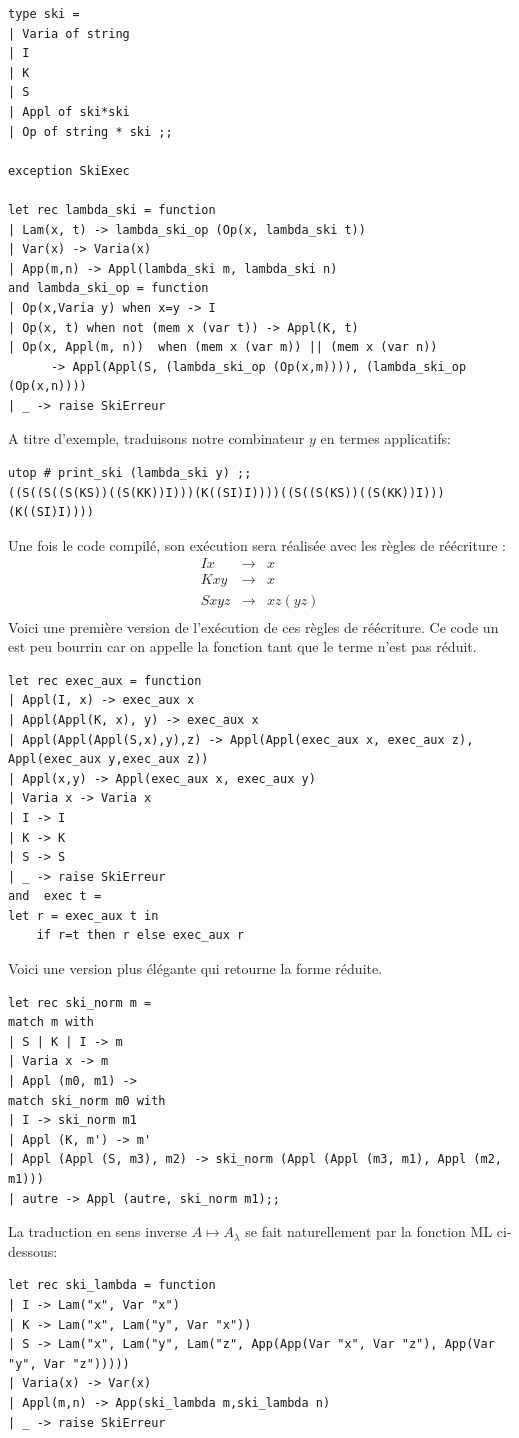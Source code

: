\documentclass[11pt]{book}
\begin{document}
\begin{Verbatim}
type ski = 
| Varia of string
| I
| K
| S
| Appl of ski*ski 
| Op of string * ski ;;

exception SkiExec

let rec lambda_ski = function
| Lam(x, t) -> lambda_ski_op (Op(x, lambda_ski t))
| Var(x) -> Varia(x)
| App(m,n) -> Appl(lambda_ski m, lambda_ski n) 
and lambda_ski_op = function
| Op(x,Varia y) when x=y -> I 
| Op(x, t) when not (mem x (var t)) -> Appl(K, t) 
| Op(x, Appl(m, n))  when (mem x (var m)) || (mem x (var n)) 
	  -> Appl(Appl(S, (lambda_ski_op (Op(x,m)))), (lambda_ski_op (Op(x,n)))) 
| _ -> raise SkiErreur
\end{Verbatim}
A titre d'exemple, traduisons notre combinateur $y$ en termes applicatifs:
\begin{Verbatim}
utop # print_ski (lambda_ski y) ;;
((S((S((S(KS))((S(KK))I)))(K((SI)I))))((S((S(KS))((S(KK))I)))(K((SI)I))))
\end{Verbatim}
Une fois le code compilé, son exécution sera réalisée avec les règles de réécriture :
\[
\begin{array}{ccc}
	Ix &\longrightarrow & x \\
	Kxy &\longrightarrow & x \\
	Sxyz &\longrightarrow & x z (y z)	\\
\end{array}	
\]
Voici une première version de l'exécution de ces règles de réécriture. Ce code un est peu bourrin car on appelle
la fonction tant que le terme n'est pas réduit.
\begin{Verbatim}
let rec exec_aux = function
| Appl(I, x) -> exec_aux x
| Appl(Appl(K, x), y) -> exec_aux x
| Appl(Appl(Appl(S,x),y),z) -> Appl(Appl(exec_aux x, exec_aux z), Appl(exec_aux y,exec_aux z))
| Appl(x,y) -> Appl(exec_aux x, exec_aux y)
| Varia x -> Varia x
| I -> I
| K -> K
| S -> S
| _ -> raise SkiErreur 
and  exec t =
let r = exec_aux t in
	if r=t then r else exec_aux r 
\end{Verbatim}

Voici une version plus élégante qui retourne la forme réduite.
\begin{Verbatim}
let rec ski_norm m =
match m with
| S | K | I -> m
| Varia x -> m
| Appl (m0, m1) ->
match ski_norm m0 with
| I -> ski_norm m1
| Appl (K, m') -> m'
| Appl (Appl (S, m3), m2) -> ski_norm (Appl (Appl (m3, m1), Appl (m2, m1)))
| autre -> Appl (autre, ski_norm m1);;
\end{Verbatim}

La traduction en sens inverse $A \mapsto A_\lambda $ se fait naturellement par la fonction ML ci-dessous:
\begin{Verbatim}
let rec ski_lambda = function
| I -> Lam("x", Var "x")
| K -> Lam("x", Lam("y", Var "x"))
| S -> Lam("x", Lam("y", Lam("z", App(App(Var "x", Var "z"), App(Var "y", Var "z")))))
| Varia(x) -> Var(x)
| Appl(m,n) -> App(ski_lambda m,ski_lambda n)
| _ -> raise SkiErreur
\end{Verbatim}
\end{document}
